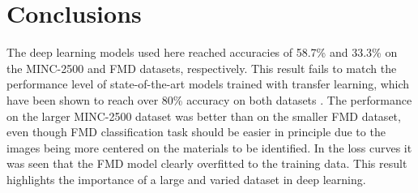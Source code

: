 \documentclass[12pt,a4paper]{article}
\begin{document}
	\section{Conclusions}
	
	The deep learning models used here reached accuracies of 58.7\% and 33.3\% on the MINC-2500 and FMD datasets, respectively. This result fails to match the performance level of state-of-the-art models trained with transfer learning, which have been shown to reach over 80\% accuracy on both datasets \cite{bell_2015,zhang_2015}. The performance on the larger MINC-2500 dataset was better than on the smaller FMD dataset, even though FMD classification task should be easier in principle due to the images being more centered on the materials to be identified. In the loss curves it was seen that the FMD model clearly overfitted to the training data. This result highlights the importance of a large and varied dataset in deep learning. 
	
	\printbibliography
	
	
\end{document}
